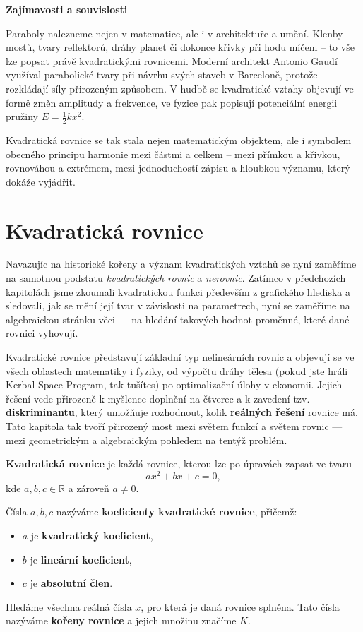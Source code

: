 \documentclass[12pt,a4paper]{article}
\begin{document}
\begin{historicalbox}
\textbf{Zajímavosti a souvislosti}

Paraboly nalezneme nejen v matematice, ale i v architektuře a umění. Klenby mostů, tvary reflektorů, dráhy planet či dokonce křivky při hodu míčem – to vše lze popsat právě kvadratickými rovnicemi. Moderní architekt Antonio Gaudí využíval parabolické tvary při návrhu svých staveb v Barceloně, protože rozkládají síly přirozeným způsobem. V hudbě se kvadratické vztahy objevují ve formě změn amplitudy a frekvence, ve fyzice pak popisují potenciální energii pružiny \(E = \tfrac{1}{2}kx^2\).


Kvadratická rovnice se tak stala nejen matematickým objektem, ale i symbolem obecného principu harmonie mezi částmi a celkem – mezi přímkou a křivkou, rovnováhou a extrémem, mezi jednoduchostí zápisu a hloubkou významu, který dokáže vyjádřit.

\end{historicalbox}



\section{Kvadratická rovnice}
Navazujíc na historické kořeny a význam kvadratických vztahů se nyní zaměříme na 
samotnou podstatu \textit{kvadratických rovnic} a \textit{nerovnic}.  
Zatímco v předchozích kapitolách jsme zkoumali kvadratickou funkci především 
z grafického hlediska a sledovali, jak se mění její tvar v závislosti na parametrech, 
nyní se zaměříme na algebraickou stránku věci — na hledání takových hodnot proměnné, 
které dané rovnici vyhovují.

Kvadratické rovnice představují základní typ nelineárních rovnic a 
objevují se ve všech oblastech matematiky i fyziky, 
od výpočtu dráhy tělesa (pokud jste hráli Kerbal Space Program, tak tušítes) po optimalizační úlohy v ekonomii. 
Jejich řešení vede přirozeně k myšlence doplnění na čtverec a k zavedení tzv. 
\textbf{diskriminantu}, který umožňuje rozhodnout, kolik \textbf{reálných řešení} rovnice má.  
Tato kapitola tak tvoří přirozený most mezi světem funkcí a světem rovnic — 
mezi geometrickým a algebraickým pohledem na tentýž problém.

\begin{definitionbox}
\textbf{Kvadratická rovnice} je každá rovnice, kterou lze po úpravách zapsat ve tvaru
\[
ax^2 + bx + c = 0,
\]
kde \(a, b, c \in \mathbb{R}\) a zároveň \(a \neq 0\).

Čísla \(a, b, c\) nazýváme \textbf{koeficienty kvadratické rovnice}, přičemž:
\begin{itemize}
  \item \(a\) je \textbf{kvadratický koeficient},
  \item \(b\) je \textbf{lineární koeficient},
  \item \(c\) je \textbf{absolutní člen}.
\end{itemize}

Hledáme všechna reálná čísla \(x\), pro která je daná rovnice splněna.  
Tato čísla nazýváme \textbf{kořeny rovnice} a jejich množinu značíme \(K\).
\end{definitionbox}
\end{document}
